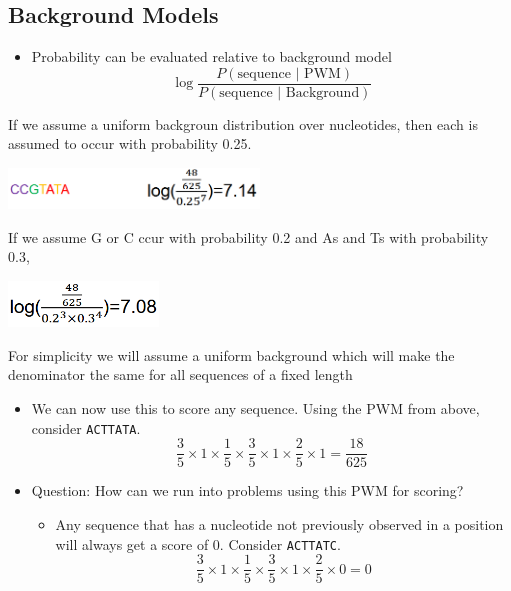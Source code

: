 \documentclass[10pt]{article}
\begin{document}
\subsection*{Background Models}
\begin{itemize}
	\item Probability can be evaluated relative to background model
	\[\log \frac{P(\text{sequence | PWM})}{P(\text{sequence | Background})}\]
\end{itemize}
If we assume a uniform backgroun distribution over nucleotides, then each is assumed to occur with probability 0.25.
\begin{center} 
	\includegraphics*[width=0.5\textwidth]{W7_9.png} 
\end{center}
If we assume G or C ccur with probability 0.2 and As and Ts with probability 0.3,
\begin{center} 
	\includegraphics*[width=0.3\textwidth]{W7_10.png} 
\end{center}
For simplicity we will assume a uniform background which will make the denominator the same for all sequences of a fixed length
\begin{itemize}
	\item We can now use this to score any sequence.  Using the PWM from above, consider \texttt{ACTTATA}.
	\[\frac{3}{5} \times 1 \times \frac{1}{5} \times \frac{3}{5} \times 1 \times \frac{2}{5} \times 1 = \frac{18}{625}\]
    \item Question: How can we run into problems using this PWM for scoring?
    \begin{itemize}
        \item Any sequence that has a nucleotide not previously observed in a position will always get a score of 0.  Consider \texttt{ACTTATC}.
        \[\frac{3}{5} \times 1 \times \frac{1}{5} \times \frac{3}{5} \times 1 \times \frac{2}{5} \times 0 = 0\]
    \end{itemize}
\end{itemize}
\end{document}
